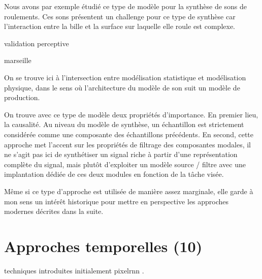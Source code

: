 Nous avons par exemple étudié ce type de modèle pour la synthèse de sons de roulements. Ces sons présentent un challenge pour ce type de synthèse car l'interaction entre la bille et la surface sur laquelle elle roule est complexe.

 \cite{LagrangeTasslp10}

 validation perceptive

marseille \cite{conan2014synthesis}

On se trouve ici à l'intersection entre modélisation statistique et modélisation physique, dans le sens où l'architecture du modèle de son suit un modèle de production.



On trouve avec ce type de modèle deux propriétés d'importance. En premier lieu, la causalité. Au niveau du modèle de synthèse, un échantillon est strictement considérée comme une composante des échantillons précédents.  En second, cette approche met l'accent sur les propriétés de filtrage des composantes modales, il ne s'agit pas ici de synthétiser un signal riche à partir d'une représentation complète du signal, mais plutôt d'exploiter un modèle source / filtre avec une implantation dédiée de ces deux modules en fonction de la tâche visée.

Même si ce type d'approche est utilisée de manière assez marginale, elle garde à mon sens un intérêt historique pour mettre en perspective les approches modernes décrites dans la suite.

\section{Approches temporelles (10)}

\cite{wavenet}

techniques introduites initialement pixelrnn .

